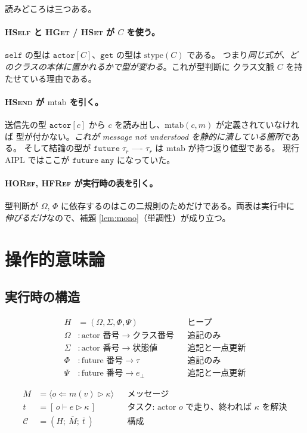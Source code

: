 \documentclass[11pt,a4paper]{ltjsarticle}
\theoremstyle{definition}
\theoremstyle{remark}
\newcommand{\tact}[1]{\mathtt{actor}[#1]}
\newcommand{\tfut}[1]{\mathtt{future}\;#1}
\newcommand{\Om}{\Omega}          %
\newcommand{\Sm}{\Sigma}          %
\newcommand{\Ph}{\Phi}            %
\newcommand{\Ps}{\Psi}            %
\newcommand{\mtab}{\mathrm{mtab}}
\newcommand{\stype}{\mathrm{stype}}
\begin{document}
読みどころは三つある。

\paragraph{\textsc{HSelf} と \textsc{HGet} / \textsc{HSet} が $C$ を使う。}
$\mathtt{self}$ の型は $\tact{C}$、$\mathtt{get}$ の型は $\stype(C)$ である。
つまり\emph{同じ式が、どのクラスの本体に置かれるかで型が変わる}。これが型判断に
クラス文脈 $C$ を持たせている理由である。

\paragraph{\textsc{HSend} が $\mtab$ を引く。}
送信先の型 $\tact{c}$ から $c$ を読み出し、$\mtab(c,m)$ が定義されていなければ
型が付かない。\emph{これが message not understood を静的に潰している箇所}である。
そして結論の型が $\tfut{\tau_r}$ ---- $\tau_r$ は $\mtab$ が持つ返り値型である。
現行 AIPL ではここが $\tfut{\mathtt{any}}$ になっていた。

\paragraph{\textsc{HORef}, \textsc{HFRef} が実行時の表を引く。}
型判断が $\Om$, $\Ph$ に依存するのはこの二規則のためだけである。両表は実行中に
\emph{伸びるだけ}なので、補題 \ref{lem:mono}（単調性）が成り立つ。

\section{操作的意味論}

\subsection{実行時の構造}

\begin{align*}
H &= (\Om, \Sm, \Ph, \Ps) && \text{ヒープ}\\
\Om &: \text{actor 番号} \to \text{クラス番号} && \text{追記のみ}\\
\Sm &: \text{actor 番号} \to \text{状態値} && \text{追記と一点更新}\\
\Ph &: \text{future 番号} \to \tau && \text{追記のみ}\\
\Ps &: \text{future 番号} \to e_\bot && \text{追記と一点更新}
\end{align*}

\begin{align*}
M &= \langle o \Leftarrow m(v) \rhd \kappa\rangle && \text{メッセージ}\\
t &= [\,o \vdash e \rhd \kappa\,] && \text{タスク: actor $o$ で走り、終われば $\kappa$ を解決}\\
\mathcal{C} &= (H;\ \overline{M};\ \overline{t}\,) && \text{構成}
\end{align*}
\end{document}
